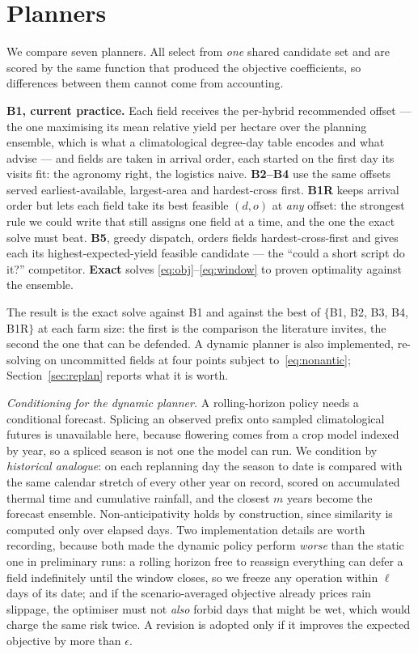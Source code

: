 \documentclass[10pt,twocolumn]{article}
\begin{document}
\section{Planners}
\label{sec:strategies}

We compare seven planners. All select from \emph{one} shared candidate set
and are scored by the same function that produced the objective
coefficients, so differences between them cannot come from accounting.

\textbf{B1, current practice.} Each field receives the per-hybrid
recommended offset --- the one maximising its mean relative yield per
hectare over the planning ensemble, which is what a climatological
degree-day table encodes and what~\cite{chassaigne2021,asefa2024} advise ---
and fields are taken in arrival order, each started on the first day its
visits fit: the agronomy right, the logistics naive. \textbf{B2--B4} use the
same offsets served
earliest-available, largest-area and hardest-cross first. \textbf{B1R}
keeps arrival order but lets each field take its best feasible $(d,o)$ at
\emph{any} offset: the strongest rule we could write that still assigns one
field at a time, and the one the exact solve must beat. \textbf{B5}, greedy
dispatch, orders fields hardest-cross-first and gives each its
highest-expected-yield feasible candidate --- the ``could a short script do
it?'' competitor. \textbf{Exact} solves
\eqref{eq:obj}--\eqref{eq:window} to proven optimality against the ensemble.

The result is the exact solve against B1 and against the best of
$\{$B1, B2, B3, B4, B1R$\}$ at each farm size: the first is the comparison
the literature invites, the second the one that can be defended. A dynamic
planner is also implemented, re-solving on uncommitted fields at four points
subject to~\eqref{eq:nonantic}; Section~\ref{sec:replan} reports what it is
worth.

\emph{Conditioning for the dynamic planner.} A rolling-horizon policy needs
a conditional forecast. Splicing an observed
prefix onto sampled climatological futures is unavailable here, because
flowering comes from a crop model indexed by year, so a spliced season is
not one the model can run. We condition by \emph{historical analogue}: on
each replanning day the season to date is compared with the same calendar
stretch of every other year on record, scored on accumulated thermal time
and cumulative rainfall, and the closest $m$ years become the forecast
ensemble. Non-anticipativity holds by construction, since similarity is
computed only over elapsed days. Two implementation details are worth
recording, because both made the dynamic policy perform \emph{worse} than
the static one in preliminary runs: a rolling horizon free to reassign
everything can defer a field indefinitely until the window closes, so we
freeze any operation within $\ell$ days of its date; and if the
scenario-averaged objective already prices rain slippage, the optimiser must
not \emph{also} forbid days that might be wet, which would charge the same
risk twice. A revision is adopted only if it improves the expected objective
by more than $\epsilon$.
\end{document}
